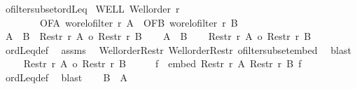 \begin{isabellebody}
\isanewline
{}\isamarkupfalse%
\ ofilter{\isacharunderscore}{\kern0pt}subset{\isacharunderscore}{\kern0pt}ordLeq{\isacharcolon}{\kern0pt}\isanewline
{}\ WELL{\isacharcolon}{\kern0pt}\ {\isachardoublequoteopen}Well{\isacharunderscore}{\kern0pt}order\ r{\isachardoublequoteclose}\ \isanewline
\ \ \ \ \ \ \ \ OFA{\isacharcolon}{\kern0pt}\ {\isachardoublequoteopen}wo{\isacharunderscore}{\kern0pt}rel{\isachardot}{\kern0pt}ofilter\ r\ A{\isachardoublequoteclose}\ \ OFB{\isacharcolon}{\kern0pt}\ {\isachardoublequoteopen}wo{\isacharunderscore}{\kern0pt}rel{\isachardot}{\kern0pt}ofilter\ r\ B{\isachardoublequoteclose}\isanewline
{}\ {\isachardoublequoteopen}{\isacharparenleft}{\kern0pt}A\ {\isasymle}\ B{\isacharparenright}{\kern0pt}\ {\isacharequal}{\kern0pt}\ {\isacharparenleft}{\kern0pt}Restr\ r\ A\ {\isasymle}o\ Restr\ r\ B{\isacharparenright}{\kern0pt}{\isachardoublequoteclose}\isanewline
%
\isadelimproof
%
\endisadelimproof
%
\isatagproof
{}\isamarkupfalse%
\isanewline
\ \ \isamarkupfalse%
\ {\isachardoublequoteopen}A\ {\isasymle}\ B{\isachardoublequoteclose}\isanewline
\ \ \isamarkupfalse%
\ {\isachardoublequoteopen}Restr\ r\ A\ {\isasymle}o\ Restr\ r\ B{\isachardoublequoteclose}\isanewline
\ \ \isamarkupfalse%
\ ordLeq{\isacharunderscore}{\kern0pt}def\ \isamarkupfalse%
\ assms\isanewline
\ \ Well{\isacharunderscore}{\kern0pt}order{\isacharunderscore}{\kern0pt}Restr\ Well{\isacharunderscore}{\kern0pt}order{\isacharunderscore}{\kern0pt}Restr\ ofilter{\isacharunderscore}{\kern0pt}subset{\isacharunderscore}{\kern0pt}embed\ \isamarkupfalse%
\ blast\isanewline
{}\isamarkupfalse%
\isanewline
\ \ \isamarkupfalse%
\ {\isacharasterisk}{\kern0pt}{\isacharcolon}{\kern0pt}\ {\isachardoublequoteopen}Restr\ r\ A\ {\isasymle}o\ Restr\ r\ B{\isachardoublequoteclose}\isanewline
\ \ \isamarkupfalse%
\ \isamarkupfalse%
\ f\ \ {\isachardoublequoteopen}embed\ {\isacharparenleft}{\kern0pt}Restr\ r\ A{\isacharparenright}{\kern0pt}\ {\isacharparenleft}{\kern0pt}Restr\ r\ B{\isacharparenright}{\kern0pt}\ f{\isachardoublequoteclose}\isanewline
\ \ \isamarkupfalse%
\ ordLeq{\isacharunderscore}{\kern0pt}def\ \isamarkupfalse%
\ blast\isanewline
\ \ \isacommand{{\isacharbraceleft}{\kern0pt}}\isamarkupfalse%
\isamarkupfalse%
\ {\isachardoublequoteopen}B\ {\isacharless}{\kern0pt}\ A{\isachardoublequoteclose}\isanewline

\end{isabellebody}
